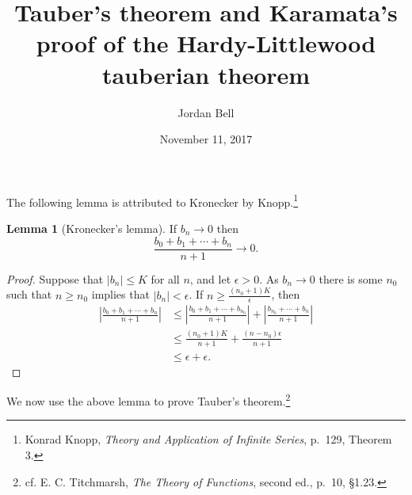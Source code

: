 \documentclass{article}
\theoremstyle{definition}
\newtheorem{lemma}[theorem]{Lemma}
\begin{document}
\title{Tauber's theorem and Karamata's proof of the Hardy-Littlewood tauberian theorem}
\author{Jordan Bell}
\date{November 11, 2017}
\maketitle

The following lemma is attributed to Kronecker by Knopp.\footnote{Konrad Knopp, {\em Theory and Application of Infinite Series}, p.~129, Theorem 3.}

\begin{lemma}[Kronecker's lemma]
If $b_n \to 0$ then
\[
\frac{b_0+b_1+\cdots+b_n}{n+1} \to 0.
\]
\label{limitlemma}
\end{lemma}
\begin{proof}
Suppose that $|b_n| \leq K$ for all $n$, and let $\epsilon>0$. As $b_n \to 0$ there is some $n_0$ such that $n \geq n_0$ implies that
$|b_n|<\epsilon$. If $n \geq \frac{(n_0+1)K}{\epsilon}$, then
\begin{align*}
\left| \frac{b_0+b_1+\cdots+b_n}{n+1} \right| &\leq 
\left| \frac{b_0+b_1+\cdots+b_{n_0}}{n+1} \right| 
+\left| \frac{b_{n_0}+\cdots+b_n}{n+1} \right|\\
&\leq \frac{(n_0+1)K}{n+1}+\frac{(n-n_0)\epsilon}{n+1}\\
&\leq \epsilon+\epsilon.
\end{align*}
\end{proof}

We now use the above lemma to prove Tauber's theorem.\footnote{cf. E. C. Titchmarsh, {\em The Theory of Functions}, second ed., p.~10, \S 1.23.}
\end{document}
